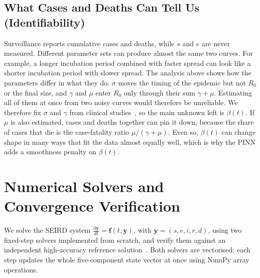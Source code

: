 \documentclass[11pt,a4paper]{article}
\begin{document}
\subsection{What Cases and Deaths Can Tell Us (Identifiability)}
Surveillance reports cumulative cases and deaths, while $s$ and $e$ are never measured. Different parameter sets can produce almost the same two curves. For example, a longer incubation period combined with faster spread can look like a shorter incubation period with slower spread. The analysis above shows how the parameters differ in what they do. $\sigma$ moves the timing of the epidemic but not $R_0$ or the final size, and $\gamma$ and $\mu$ enter $R_0$ only through their sum $\gamma + \mu$. Estimating all of them at once from two noisy curves would therefore be unreliable. We therefore fix $\sigma$ and $\gamma$ from clinical studies~\cite{who2014ebola}, so the main unknown left is $\beta(t)$. If $\mu$ is also estimated, cases and deaths together can pin it down, because the share of cases that die is the case-fatality ratio $\mu/(\gamma+\mu)$. Even so, $\beta(t)$ can change shape in many ways that fit the data almost equally well, which is why the PINN adds a smoothness penalty on $\beta(t)$.

\section{Numerical Solvers and Convergence Verification}
\label{sec:numerics}

We solve the SEIRD system $\frac{d\mathbf{y}}{dt} = \mathbf{f}(t, \mathbf{y})$, with $\mathbf{y} = (s, e, i, r, d)$, using two fixed-step solvers implemented from scratch, and verify them against an independent high-accuracy reference solution~\cite{hairer1993solving}. Both solvers are vectorised: each step updates the whole five-component state vector at once using NumPy array operations.
\end{document}
